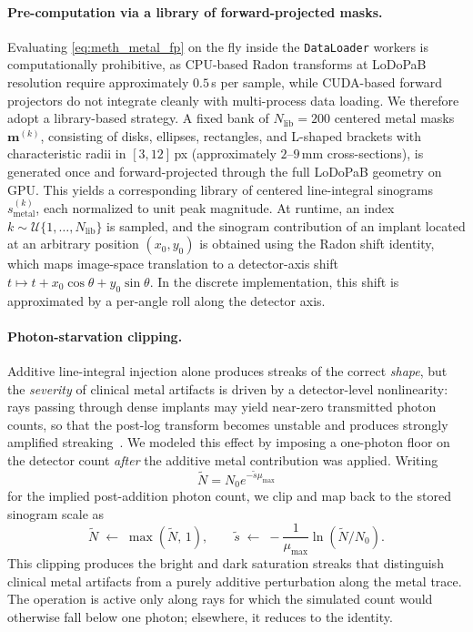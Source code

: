 \paragraph{Pre-computation via a library of forward-projected masks.}
Evaluating \eqref{eq:meth_metal_fp} on the fly inside the \texttt{DataLoader} workers is computationally prohibitive, as CPU-based Radon transforms at LoDoPaB resolution require approximately \(0.5\)\,s per sample, while CUDA-based forward projectors do not integrate cleanly with multi-process data loading. We therefore adopt a library-based strategy. A fixed bank of $N_{\text{lib}} = 200$ centered metal masks $\mathbf{m}^{(k)}$, consisting of disks, ellipses, rectangles, and L-shaped brackets with characteristic radii in $[3,12]$\,px (approximately \(2\)--\(9\)\,mm cross-sections), is generated once and forward-projected through the full LoDoPaB geometry on GPU. This yields a corresponding library of centered line-integral sinograms $s_{\mathrm{metal}}^{(k)}$, each normalized to unit peak magnitude. At runtime, an index $k \sim \mathcal{U}\{1,\dots,N_{\text{lib}}\}$ is sampled, and the sinogram contribution of an implant located at an arbitrary position $(x_0,y_0)$ is obtained using the Radon shift identity, which maps image-space translation to a detector-axis shift \(t \mapsto t + x_0\cos\theta + y_0\sin\theta\). In the discrete implementation, this shift is approximated by a per-angle roll along the detector axis.

\paragraph{Photon-starvation clipping.}
Additive line-integral injection alone produces streaks of the correct \emph{shape}, but the \emph{severity} of clinical metal artifacts is driven by a detector-level nonlinearity: rays passing through dense implants may yield near-zero transmitted photon counts, so that the post-log transform becomes unstable and produces strongly amplified streaking~\cite{Gjesteby2016, Boas2012}. We modeled this effect by imposing a one-photon floor on the detector count \emph{after} the additive metal contribution was applied. Writing
\[
    \tilde{N} = N_0 e^{-\tilde{s}\mu_{\max}}
\]
for the implied post-addition photon count, we clip and map back to the stored sinogram scale as
\begin{equation}
    \tilde{N} \;\leftarrow\; \max(\tilde{N},\,1), \qquad
    \tilde{s} \;\leftarrow\; -\frac{1}{\mu_{\max}}\ln(\tilde{N}/N_0).
    \label{eq:meth_metal_starvation}
\end{equation}
This clipping produces the bright and dark saturation streaks that distinguish clinical metal artifacts from a purely additive perturbation along the metal trace. The operation is active only along rays for which the simulated count would otherwise fall below one photon; elsewhere, it reduces to the identity.

